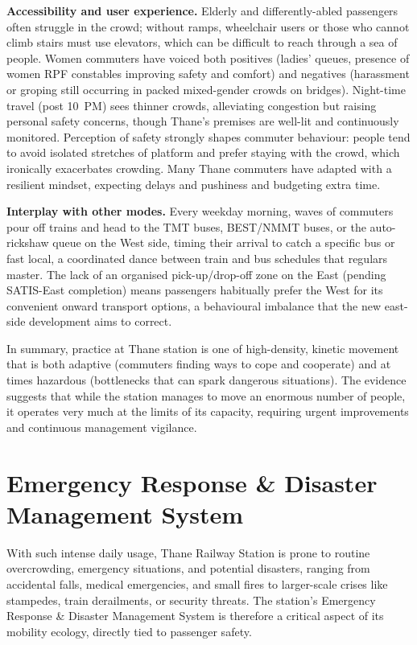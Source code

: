 \documentclass[11pt]{article}
\begin{document}
\textbf{Accessibility and user experience.} Elderly and differently-abled passengers often
struggle in the crowd; without ramps, wheelchair users or those who cannot climb stairs must use
elevators, which can be difficult to reach through a sea of people. Women commuters have voiced
both positives (ladies' queues, presence of women RPF constables improving safety and comfort)
and negatives (harassment or groping still occurring in packed mixed-gender crowds on bridges).
Night-time travel (post 10~PM) sees thinner crowds, alleviating congestion but raising personal
safety concerns, though Thane's premises are well-lit and continuously monitored. Perception of
safety strongly shapes commuter behaviour: people tend to avoid isolated stretches of platform
and prefer staying with the crowd, which ironically exacerbates crowding. Many Thane commuters
have adapted with a resilient mindset, expecting delays and pushiness and budgeting extra
time.

\textbf{Interplay with other modes.} Every weekday morning, waves of commuters pour off trains
and head to the TMT buses, BEST/NMMT buses, or the auto-rickshaw queue on the West side, timing
their arrival to catch a specific bus or fast local, a coordinated dance between train and bus
schedules that regulars master. The lack of an organised pick-up/drop-off zone on the East
(pending SATIS-East completion) means passengers habitually prefer the West for its convenient
onward transport options, a behavioural imbalance that the new east-side development aims to
correct.

In summary, practice at Thane station is one of high-density, kinetic movement that is both
adaptive (commuters finding ways to cope and cooperate) and at times hazardous (bottlenecks that
can spark dangerous situations). The evidence suggests that while the station manages to move
an enormous number of people, it operates very much at the limits of its capacity, requiring
urgent improvements and continuous management vigilance.

\section{Emergency Response \& Disaster Management System}

With such intense daily usage, Thane Railway Station is prone to routine overcrowding,
emergency situations, and potential disasters, ranging from accidental falls, medical
emergencies, and small fires to larger-scale crises like stampedes, train derailments, or
security threats. The station's Emergency Response \& Disaster Management System is therefore a
critical aspect of its mobility ecology, directly tied to passenger safety.
\end{document}
